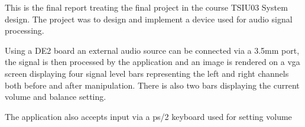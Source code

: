 This is the final report treating the final project in the course
TSIU03 System design. The project was to design and implement a device
used for audio signal processing. 

Using a DE2 board an external audio source can be connected via a
3.5mm port, the signal is then processed by the application and an
image is rendered on a vga screen displaying four signal level bars
representing the left and right channels both before and after
manipulation. There is also two bars displaying the current volume and
balance setting.

The application also accepts input via a ps/2 keyboard used for
setting volume  
